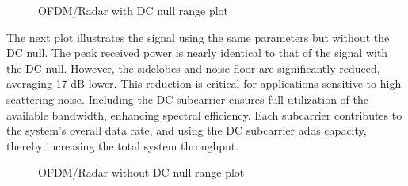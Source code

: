 \documentclass[conference]{IEEEtran}
\begin{document}
\begin{figure}[H]
\centering
{}
\caption{OFDM/Radar with DC null range plot}
\end{figure}

The next plot illustrates the signal using the same parameters but without the DC null. The peak received power is nearly identical to that of the signal with the DC null. However, the sidelobes and noise floor are significantly reduced, averaging 17 dB lower. This reduction is critical for applications sensitive to high scattering noise. Including the DC subcarrier ensures full utilization of the available bandwidth, enhancing spectral efficiency. Each subcarrier contributes to the system's overall data rate, and using the DC subcarrier adds capacity, thereby increasing the total system throughput.

\begin{figure}[H]
\centering
{}
\caption{OFDM/Radar without DC null range plot}
\end{figure}
\end{document}
